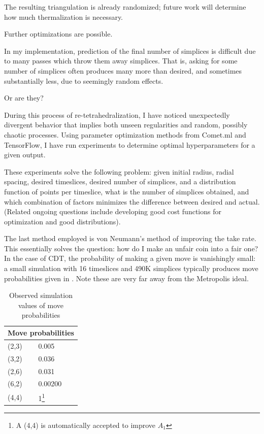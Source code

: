 \documentclass[12pt]{article}
\begin{document}
The resulting triangulation is already randomized; future work will determine how much thermalization is necessary.

Further optimizations are possible.

In my implementation, prediction of the final number of simplices is difficult due to many passes which throw them away simplices. 
That is, asking for some number of simplices often produces many more than desired, and sometimes substantially less, due to seemingly random effects.

Or are they?

During this process of re-tetrahedralization, I have noticed unexpectedly divergent behavior that implies both unseen
regularities and random, possibly chaotic processes. Using parameter optimization methods from Comet.ml \cite{comet.ml_comet.ml_nodate} and
TensorFlow\cite{noauthor_tensorflow_nodate}, I have run experiments to determine optimal hyperparameters for a given output.

These experiments solve the following problem: given initial radius, radial spacing, desired timeslices, desired number of simplices, and a distribution
function of points per timeslice, what is the number of simplices obtained, and which combination of factors minimizes the difference between desired and
actual. (Related ongoing questions include developing good cost functions for optimization and good distributions).

The last method employed is von Neumann's method of improving the take rate. This essentially solves the question: how do I make an unfair coin into
a fair one? \cite{mitzenmacher_tossing_nodate} In the case of CDT, the probability of making a given move is vanishingly small: a small simulation with
16 timeslices and 490K simplices typically produces move probabilities given in . Note these are very far away from the Metropolis
ideal.

\begin{table}
\begin{center}
  \begin{tabular}{|l|l|}
    \hline
    \multicolumn{2}{|c|}{Move probabilities} \\
    \hline
    (2,3) & 0.005 \\
    (3,2) & 0.036 \\
    (2,6) & 0.031 \\
    (6,2) & 0.00200 \\
    (4,4) & 1\footnote{A (4,4) is automatically accepted to improve $A_1$}\\
    \hline
    \end{tabular}
  \end{center}
    \caption{Observed simulation values of move probabilities}
    \label{table-moveprob}
  \end{table}
\end{document}
